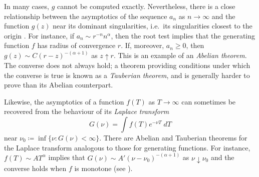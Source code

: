In many cases, $g$ cannot be computed exactly. Nevertheless, there is a close
relationship between the asymptotics of the sequence $a_n$
as $n\to\infty$ and the function $g(z)$ near its dominant singularities, i.e.\
its singularities closest to the origin \cite{FS09}.
For instance, if $a_n \sim r^{-n} n^\alpha$, then the root test implies that
the generating function $f$ has radius of convergence $r$. If, moreover, $a_n \ge 0$,
then $g(z) \sim C (r - z)^{-(\alpha+1)}$ as $z \uparrow r$.		%
This is an
example of an \emph{Abelian theorem}. The converse does not always hold; a
theorem providing conditions under which the converse is true is known as a
\emph{Tauberian theorem}, and is generally harder to prove than its Abelian
counterpart.


Likewise, the asymptotics of a function $f(T)$ as $T\to\infty$ can sometimes
be recovered from the behaviour of its \emph{Laplace transform}
\begin{equation}
\label{e:laplace-transform-def}
G(\nu) = \int f(T) e^{-\nu T} \; dT
\end{equation}
near $\nu_0 \coloneqq \inf \{ \nu : G(\nu) < \infty \}$.
There are Abelian and Tauberian theorems for the Laplace transform analogous
to those for generating functions. For instance,
$f(T) \sim A T^\alpha$ implies that $G(\nu) \sim A' (\nu - \nu_0)^{-(\alpha+1)}$
as $\nu\downarrow\nu_0$ and the converse holds when $f$ is monotone (see \cite{Widd41}).

% 
% 

